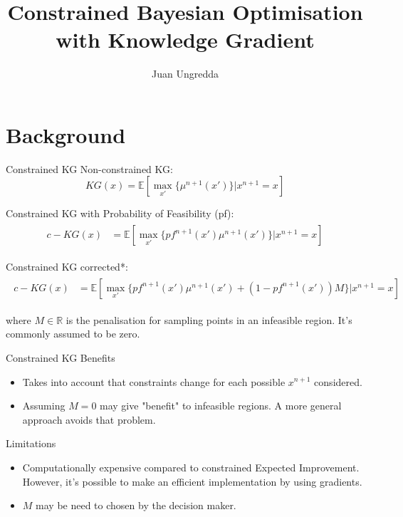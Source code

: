 \documentclass{beamer}
\title[]{Constrained Bayesian Optimisation with Knowledge Gradient}
\author[Juan Ungredda]{\small Juan Ungredda}
\institute[]{University of Warwick}
\date{}
\begin{document}


\section{Background}

\begin{frame}{Constrained KG}
Non-constrained KG:
$$KG(x) = \mathbb{E}[\max_{x'}\{\mu^{n+1}(x')\}|x^{n+1}=x]$$

Constrained KG with Probability of Feasibility (pf):
\begin{align*}
\begin{split}
c-KG(x) &= \mathbb{E}[\max_{x'}\{pf^{n+1}(x')\mu^{n+1}(x')\}|x^{n+1}=x]
\end{split}
\end{align*}

Constrained KG corrected*:
\begin{align*}
\begin{split}
c-KG(x) &= \mathbb{E}[\max_{x'}\{pf^{n+1}(x')\mu^{n+1}(x') + (1-pf^{n+1}(x'))M\}|x^{n+1}=x]
\end{split}
\end{align*}

where $M\in \mathbb{R}$ is the penalisation for sampling points in an infeasible region. It's commonly assumed to be zero.

\end{frame}

\begin{frame}{Constrained KG}
Benefits
\begin{itemize}
	\item Takes into account that constraints change for each possible $x^{n+1}$ considered.
	\item Assuming $M=0$ may give "benefit" to infeasible regions. A more general approach avoids that problem.
\end{itemize}
Limitations
\begin{itemize}
	\item Computationally expensive compared to constrained Expected Improvement. However, it's possible to make an efficient implementation by using gradients.
	\item $M$ may be need to chosen by the decision maker.
\end{itemize}

\end{frame}
\end{document}
